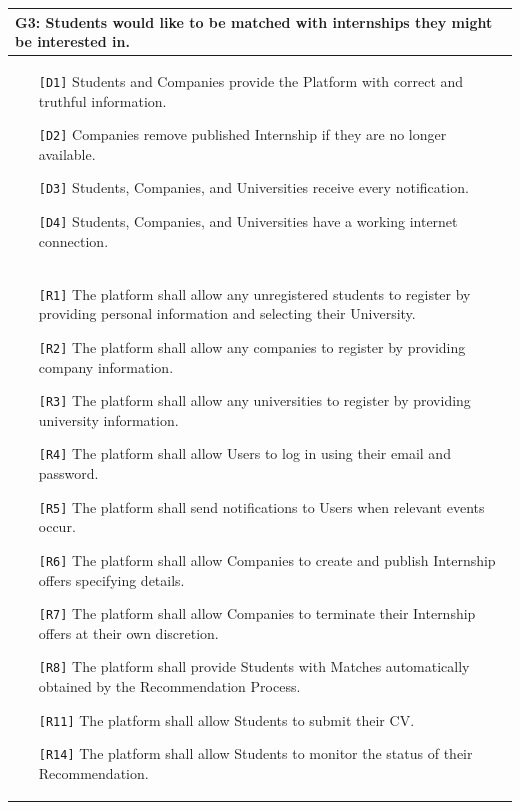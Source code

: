\begin{table}[H]
    \centering
    \begin{tabular}{|p{15cm}|}
        \hline
        \textbf{G3:} Students would like to be matched with internships they might be interested in. \\ \hline
        \begin{itemize}
            \item[\texttt{[D1]}] Students and Companies provide the Platform with correct and truthful information.
            \item[\texttt{[D2]}] Companies remove published Internship if they are no longer available.
            \item[\texttt{[D3]}] Students, Companies, and Universities receive every notification.
            \item[\texttt{[D4]}] Students, Companies, and Universities have a working internet connection.
        \end{itemize} \\ \hline
        \begin{itemize}
            \item[\texttt{[R1]}] The platform shall allow any unregistered students to register by providing personal information and selecting their University.
            \item[\texttt{[R2]}] The platform shall allow any companies to register by providing company information.
            \item[\texttt{[R3]}] The platform shall allow any universities to register by providing university information.
            \item[\texttt{[R4]}] The platform shall allow Users to log in using their email and password.
            \item[\texttt{[R5]}] The platform shall send notifications to Users when relevant events occur.
            \item[\texttt{[R6]}] The platform shall allow Companies to create and publish Internship offers specifying details.
            \item[\texttt{[R7]}] The platform shall allow Companies to terminate their Internship offers at their own discretion.
            \item[\texttt{[R8]}] The platform shall provide Students with Matches automatically obtained by the Recommendation Process. 
            \item[\texttt{[R11]}] The platform shall allow Students to submit their CV.
            \item[\texttt{[R14]}] The platform shall allow Students to monitor the status of their Recommendation.

\end{itemize}
\end{tabular}
\end{table}

